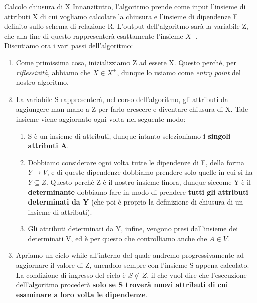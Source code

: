 \documentclass[12pt]{report}
\newcommand{\ra}{
	\rightarrow
}
\begin{document}
	\begin{algoritmo}{Calcolo chiusura di X}{}
		Innanzitutto, l'algoritmo prende come input l'insieme di attributi X di cui vogliamo calcolare la chiusura e l'insieme di dipendenze F definito sullo schema di relazione R. L'output dell'algoritmo sarà la variabile Z, che alla fine di questo rappresenterà esattamente l'insieme $X^+$.\\
		Discutiamo ora i vari passi dell'algoritmo:
		\begin{enumerate}
			\item Come primissima cosa, inizializziamo Z ad essere X. Questo perché, per \textit{riflessività}, abbiamo che $X \in X^+$, dunque lo usiamo come \textit{entry point} del nostro algoritmo.
			
			\item La variabile S rappresenterà, nel corso dell'algoritmo, gli attributi da aggiungere man mano a Z per farlo crescere e diventare chiusura di X. Tale insieme viene aggiornato ogni volta nel seguente modo:
			\begin{enumerate}
				\item S è un insieme di attributi, dunque intanto selezioniamo \textbf{i singoli attributi A}.
				
				\item Dobbiamo considerare ogni volta tutte le dipendenze di F, della forma $Y \ra V$, e di queste dipendenze dobbiamo prendere solo quelle in cui si ha $Y \subseteq Z$. Questo perché Z è il nostro insieme finora, dunque siccome Y è il \textbf{determinante} dobbiamo fare in modo di prendere \textbf{tutti gli attributi determinati da Y} (che poi è proprio la definizione di chiusura di un insieme di attributi).
				
				\item Gli attributi determinati da Y, infine, vengono presi dall'insieme dei determinati V, ed è per questo che controlliamo anche che $A \in V$.
			\end{enumerate}
			
			\item Apriamo un ciclo while all'interno del quale andremo progressivamente ad aggiornare il valore di Z, unendolo sempre con l'insieme S appena calcolato. La condizione di ingresso del ciclo è $S \not\subset Z$, il che vuol dire che l'esecuzione dell'algoritmo procederà \textbf{solo se S troverà nuovi attributi di cui esaminare a loro volta le dipendenze}.
		\end{enumerate}
	\end{algoritmo}
	
\end{document}
